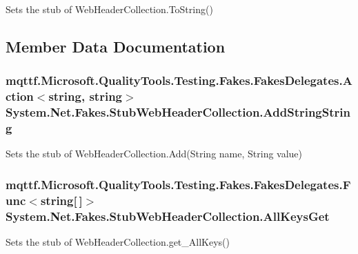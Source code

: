 Sets the stub of Web\-Header\-Collection.\-To\-String()



\subsection{Member Data Documentation}
\hypertarget{class_system_1_1_net_1_1_fakes_1_1_stub_web_header_collection_a314faa07f5206bd10fe602bde8762879}{
\subsubsection[{Add\-String\-String}]{\setlength{\rightskip}{0pt plus 5cm}mqttf.\-Microsoft.\-Quality\-Tools.\-Testing.\-Fakes.\-Fakes\-Delegates.\-Action$<$string, string$>$ System.\-Net.\-Fakes.\-Stub\-Web\-Header\-Collection.\-Add\-String\-String}}\label{class_system_1_1_net_1_1_fakes_1_1_stub_web_header_collection_a314faa07f5206bd10fe602bde8762879}


Sets the stub of Web\-Header\-Collection.\-Add(\-String name, String value)

\hypertarget{class_system_1_1_net_1_1_fakes_1_1_stub_web_header_collection_a41d29828607c8780b3ba6e64cf06d331}{
\subsubsection[{All\-Keys\-Get}]{\setlength{\rightskip}{0pt plus 5cm}mqttf.\-Microsoft.\-Quality\-Tools.\-Testing.\-Fakes.\-Fakes\-Delegates.\-Func$<$string\mbox{[}$\,$\mbox{]}$>$ System.\-Net.\-Fakes.\-Stub\-Web\-Header\-Collection.\-All\-Keys\-Get}}\label{class_system_1_1_net_1_1_fakes_1_1_stub_web_header_collection_a41d29828607c8780b3ba6e64cf06d331}


Sets the stub of Web\-Header\-Collection.\-get\-\_\-\-All\-Keys()

